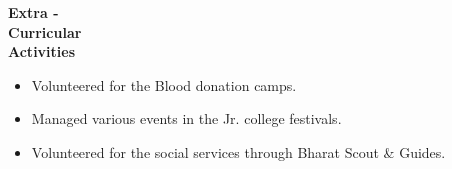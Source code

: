 \documentclass{article}
\begin{document}
	     	 	
	     \begin{flushleft} 
	     	\vspace{0.4in}
	     	\textbf{Extra - \\Curricular \\Activities }
	     	\begin{itemize}
	     		\vspace{-0.65in}
	     		\addtolength{\itemindent}{1.359in}
	     		\item  Volunteered for the Blood donation camps.
	     		\item  Managed various events in the Jr. college festivals.
	     		\item  Volunteered for the social services through Bharat Scout \& Guides.  
	     		
	     	\end{itemize}
	     \end{flushleft}
	
\end{document}
